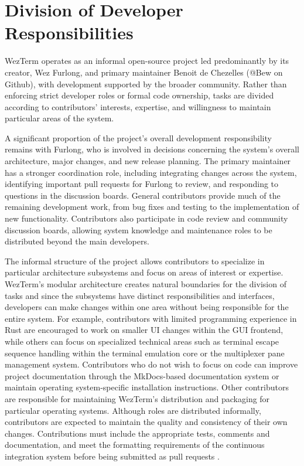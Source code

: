\section{Division of Developer Responsibilities}
\label{sec:developer-responsibilities}

WezTerm operates as an informal open-source project led predominantly by its creator, Wez Furlong, and primary maintainer Benoit de Chezelles (@Bew on Github), with development supported by the broader community. Rather than enforcing strict developer roles or formal code ownership, tasks are divided according to contributors' interests, expertise, and willingness to maintain particular areas of the system. 

A significant proportion of the project's overall development responsibility remains with Furlong, who is involved in decisions concerning the system's overall architecture, major changes, and new release planning. The primary maintainer has a stronger coordination role, including integrating changes across the system, identifying important pull requests for Furlong to review, and responding to questions in the discussion boards. General contributors provide much of the remaining development work, from bug fixes and testing to the implementation of new functionality. Contributors also participate in code review and community discussion boards, allowing system knowledge and maintenance roles to be distributed beyond the main developers.

The informal structure of the project allows contributors to specialize in particular architecture subsystems and focus on areas of interest or expertise. WezTerm's modular architecture creates natural boundaries for the division of tasks and since the subsystems have distinct responsibilities and interfaces, developers can make changes within one area without being responsible for the entire system. For example, contributors with limited programming experience in Rust are encouraged to work on smaller UI changes within the GUI frontend, while others can focus on specialized technical areas such as terminal escape sequence handling within the terminal emulation core or the multiplexer pane management system. Contributors who do not wish to focus on code can improve project documentation through the MkDocs-based documentation system or maintain operating system-specific installation instructions. Other contributors are responsible for maintaining WezTerm's distribution and packaging for particular operating systems. Although roles are distributed informally, contributors are expected to maintain the quality and consistency of their own changes. Contributions must include the appropriate tests, comments and documentation, and meet the formatting requirements of the continuous integration system before being submitted as pull requests \cite{contributing}.
